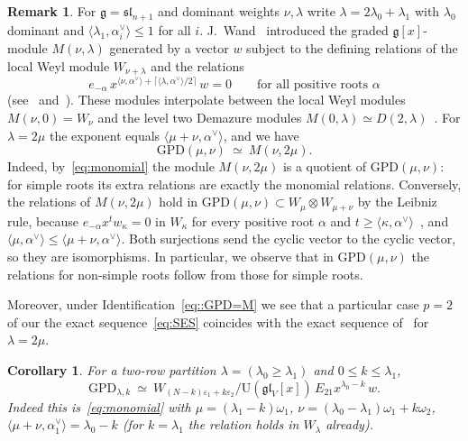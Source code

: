 \documentclass[11pt]{amsart}
\numberwithin{equation}{section}
\newtheorem{corollary}[equation]{Corollary}
\theoremstyle{definition}
\newtheorem{remark}[equation]{Remark}
\newcommand{\gl}{\mathfrak{gl}}
\newcommand{\fg}{\mathfrak{g}}
\newcommand{\U}{\mathrm{U}}
\newcommand{\GPD}{\mathrm{GPD}}         %
\newcommand{\eps}{\varepsilon}
\begin{document}
	
	\begin{remark}\label{rem:BCSW}
		For $\fg=\mathfrak{sl}_{n+1}$ and dominant weights $\nu,\lambda$ write $\lambda=2\lambda_0+\lambda_1$ with $\lambda_0$ dominant and $\langle\lambda_1,\alpha_i^\vee\rangle\le1$ for all $i$. J.~Wand~\cite{Wand} introduced the graded $\fg[x]$-module $M(\nu,\lambda)$ generated by a vector $w$ subject to the defining relations of the local Weyl module $W_{\nu+\lambda}$ and the relations
		\[
		e_{-\alpha}\,x^{\langle\nu,\alpha^\vee\rangle+\lceil\langle\lambda,\alpha^\vee\rangle/2\rceil}\,w=0\qquad\text{for all positive roots }\alpha
		\]
		(see~\cite[\S2.2]{BCSW} and~\cite{BCM}). These modules interpolate between the local Weyl modules $M(\nu,0)=W_\nu$ and the level two Demazure modules $M(0,\lambda)\simeq D(2,\lambda)$~\cite{CSVW}. For $\lambda=2\mu$ the exponent equals $\langle\mu+\nu,\alpha^\vee\rangle$, and we have
		\begin{equation}
			\label{eq::GPD=M}	
			\GPD(\mu,\nu)\ \simeq\ M(\nu,2\mu).
		\end{equation}
		Indeed, by~\eqref{eq:monomial} the module $M(\nu,2\mu)$ is a quotient of $\GPD(\mu,\nu)$: for simple roots its extra relations are exactly the monomial relations. Conversely, the relations of $M(\nu,2\mu)$ hold in $\GPD(\mu,\nu)\subset W_\mu\otimes W_{\mu+\nu}$ by the Leibniz rule, because $e_{-\alpha}x^tw_\kappa=0$ in $W_\kappa$ for every positive root $\alpha$ and $t\ge\langle\kappa,\alpha^\vee\rangle$~\cite{CP}, and $\langle\mu,\alpha^\vee\rangle\le\langle\mu+\nu,\alpha^\vee\rangle$. Both surjections send the cyclic vector to the cyclic vector, so they are isomorphisms. 
		In particular, we observe that in $\GPD(\mu,\nu)$ the relations for non-simple roots follow from those for simple roots.
		
		Moreover, under Identification~\eqref{eq::GPD=M} we see that a particular case $p=2$ of our the exact sequence~\eqref{eq:SES}  coincides with the exact sequence of~\cite[Proposition~2.5(i)(a)]{BCSW} for $\lambda=2\mu$.
	\end{remark}
	
	\begin{corollary}\label{cor:two-rows-presentation}
		For a two-row partition $\lambda=(\lambda_0\ge\lambda_1)$ and $0\le k\le\lambda_1$,
		\[
		\GPD_{\lambda,k}\ \simeq\ W_{(N-k)\eps_1+k\eps_2}\Big/\U(\gl_V[x])\,E_{21}x^{\lambda_0-k}\,w .
		\]
		Indeed this is~\eqref{eq:monomial} with $\mu=(\lambda_1-k)\omega_1$, $\nu=(\lambda_0-\lambda_1)\omega_1+k\omega_2$, $\langle\mu+\nu,\alpha_1^\vee\rangle=\lambda_0-k$ (for $k=\lambda_1$ the relation holds in $W_\lambda$ already).
	\end{corollary}
	
\end{document}
